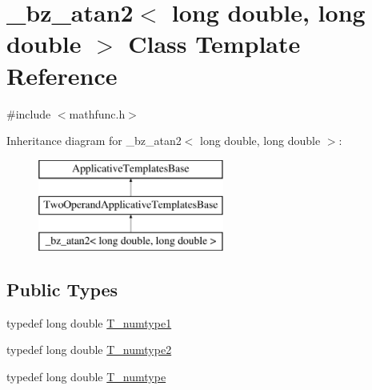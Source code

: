 \hypertarget{class__bz__atan2_3_01long_01double_00_01long_01double_01_4}{}\section{\+\_\+bz\+\_\+atan2$<$ long double, long double $>$ Class Template Reference}
\label{class__bz__atan2_3_01long_01double_00_01long_01double_01_4}


{\ttfamily \#include $<$mathfunc.\+h$>$}

Inheritance diagram for \+\_\+bz\+\_\+atan2$<$ long double, long double $>$\+:\begin{figure}[H]
\begin{center}
\leavevmode
\includegraphics[height=3.000000cm]{class__bz__atan2_3_01long_01double_00_01long_01double_01_4}
\end{center}
\end{figure}
\subsection*{Public Types}
\begin{DoxyCompactItemize}
\item 
typedef long double \hyperlink{class__bz__atan2_3_01long_01double_00_01long_01double_01_4_a98c5566fcb4e27378871c8f5ac69df5c}{T\+\_\+numtype1}
\item 
typedef long double \hyperlink{class__bz__atan2_3_01long_01double_00_01long_01double_01_4_a53d0362ba4e3c73b02bec603b4957b37}{T\+\_\+numtype2}
\item 
typedef long double \hyperlink{class__bz__atan2_3_01long_01double_00_01long_01double_01_4_a39d913da62e06bf5bbef59526946b6b9}{T\+\_\+numtype}
\end{DoxyCompactItemize}
